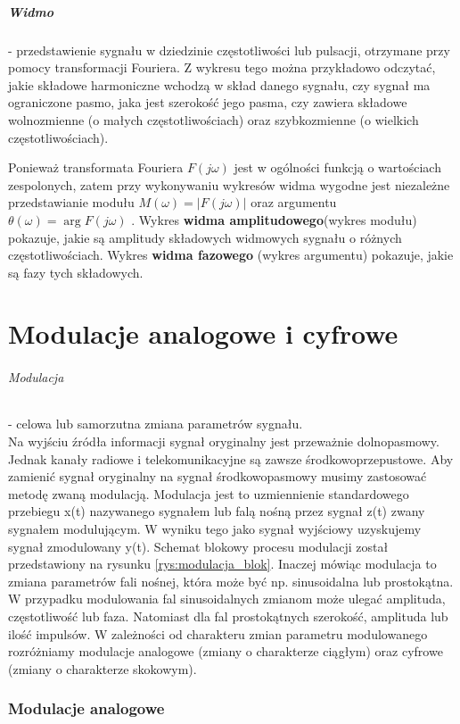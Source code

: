 \documentclass[a4paper,twoside]{report}
\begin{document}
\paragraph{Widmo} - przedstawienie sygnału w dziedzinie częstotliwości lub pulsacji, otrzymane przy pomocy transformacji Fouriera.
Z wykresu tego można przykładowo odczytać, jakie składowe harmoniczne wchodzą w skład danego sygnału, czy sygnał ma ograniczone pasmo, jaka jest szerokość jego pasma, czy zawiera składowe wolnozmienne (o małych częstotliwościach) oraz szybkozmienne (o wielkich częstotliwościach). 

Ponieważ transformata Fouriera  $ F(j \omega) $ jest w ogólności funkcją o wartościach zespolonych, zatem przy wykonywaniu wykresów widma wygodne jest niezależne przedstawianie modułu  $ M(\omega) = | F(j \omega) | $ oraz argumentu $ \theta(\omega) = \arg{F(j \omega)} $ . Wykres \textbf{widma amplitudowego}(wykres modułu) pokazuje, jakie są amplitudy składowych widmowych sygnału o różnych częstotliwościach. Wykres\textbf{ widma fazowego} (wykres argumentu) pokazuje, jakie są fazy tych składowych.

\chapter{Modulacje analogowe i cyfrowe}
\subparagraph{Modulacja} - celowa lub samorzutna zmiana parametrów sygnału. \\

Na wyjściu źródła informacji sygnał oryginalny jest przeważnie dolnopasmowy. Jednak kanały radiowe i telekomunikacyjne są zawsze środkowoprzepustowe. Aby zamienić sygnał oryginalny na sygnał środkowopasmowy musimy zastosować metodę zwaną modulacją. Modulacja jest to uzmiennienie standardowego przebiegu x(t) nazywanego sygnałem lub falą nośną przez sygnał z(t) zwany sygnałem modulującym. W wyniku tego jako sygnał wyjściowy uzyskujemy sygnał zmodulowany y(t). Schemat blokowy procesu modulacji został przedstawiony na rysunku \ref{rys:modulacja_blok}. Inaczej mówiąc modulacja to zmiana parametrów fali nośnej, która może być np. sinusoidalna lub prostokątna. W przypadku modulowania fal sinusoidalnych zmianom może ulegać amplituda, częstotliwość lub faza. Natomiast dla fal prostokątnych szerokość, amplituda lub ilość impulsów. W zależności od charakteru zmian parametru modulowanego rozróżniamy modulacje analogowe (zmiany o charakterze ciągłym) oraz cyfrowe (zmiany o charakterze skokowym).
\subsection{Modulacje analogowe}
\end{document}

